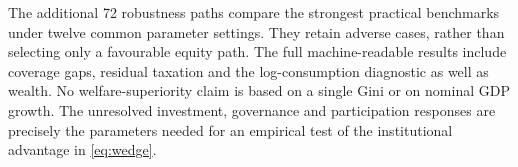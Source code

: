 The additional 72 robustness paths compare the strongest practical benchmarks under twelve common parameter settings. They retain adverse cases, rather than selecting only a favourable equity path. The full machine-readable results include coverage gaps, residual taxation and the log-consumption diagnostic as well as wealth. No welfare-superiority claim is based on a single Gini or on nominal GDP growth. The unresolved investment, governance and participation responses are precisely the parameters needed for an empirical test of the institutional advantage in \eqref{eq:wedge}.
